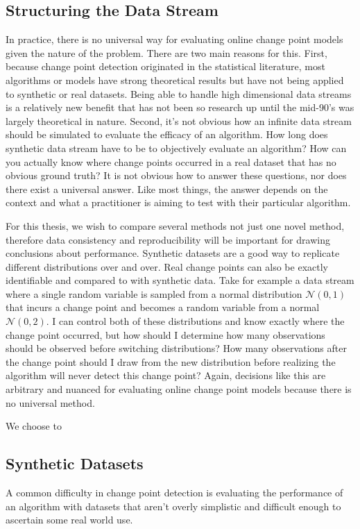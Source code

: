 \subsection{Structuring the Data Stream}
In practice, there is no universal way for evaluating online change point models given the nature of the problem. There are two main reasons for this. First, because change point detection originated in the statistical literature, most algorithms or models have strong theoretical results but have not being applied to synthetic or real datasets. Being able to handle high dimensional data streams is a relatively new benefit that has not been so research up until the mid-90's was largely theoretical in nature. Second, it's not obvious how an infinite data stream should be simulated to evaluate the efficacy of an algorithm. How long does synthetic data stream have to be to objectively evaluate an algorithm?  How can you actually know where change points occurred in a real dataset that has no obvious ground truth? It is not obvious how to answer these questions, nor does there exist a universal answer. Like most things, the answer depends on the context and what a practitioner is aiming to test with their particular algorithm.  

For this thesis, we wish to compare several methods not just one novel method, therefore data consistency and reproducibility will be important for drawing conclusions about performance. Synthetic datasets are a good way to replicate different distributions over and over. Real change points can also be exactly identifiable and compared to with synthetic data. Take for example a data stream where a single random variable is sampled from a normal distribution $\mathcal{N}(0,1)$ that incurs a change point and becomes a random variable from a normal $\mathcal{N}(0,2)$. I can control both of these distributions and know exactly where the change point occurred, but how should I determine how many observations should be observed before switching distributions? How many observations after the change point should I draw from the new distribution before realizing the algorithm will never detect this change point? Again, decisions like this are arbitrary and nuanced for evaluating online change point models because there is no universal method. 

We choose to

\subsection{Synthetic Datasets}
A common difficulty in change point detection is evaluating the performance of an algorithm with datasets that aren't overly simplistic and difficult enough to ascertain some real world use.

